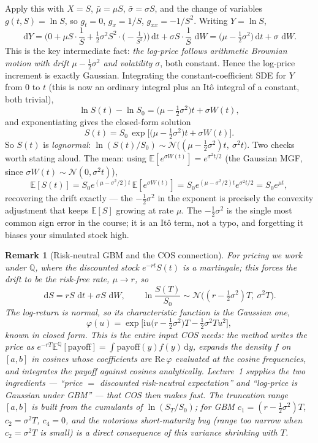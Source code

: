 \documentclass[11pt]{article}
\newcommand{\E}{\mathbb{E}}
\newcommand{\dd}{\,\mathrm{d}}
\newtheorem{remark}{Remark}
\begin{document}
Apply this with $X=S$, $\bar\mu=\mu S$, $\bar\sigma=\sigma S$, and the change of variables $g(t,S)=\ln S$, so $g_t=0$, $g_x=1/S$, $g_{xx}=-1/S^2$. Writing $Y=\ln S$,
\[
\dd Y=\Big(0+\mu S\cdot\frac1S+\tfrac12\sigma^2 S^2\cdot\big(-\tfrac1{S^2}\big)\Big)\dd t+\sigma S\cdot\frac1S\,\dd W
=\Big(\mu-\tfrac12\sigma^2\Big)\dd t+\sigma\,\dd W.
\]
This is the key intermediate fact: \emph{the log-price follows arithmetic Brownian motion with drift $\mu-\tfrac12\sigma^2$ and volatility $\sigma$}, both constant. Hence the log-price increment is exactly Gaussian. Integrating the constant-coefficient SDE for $Y$ from $0$ to $t$ (this is now an ordinary integral plus an It\^o integral of a constant, both trivial),
\[
\ln S(t)-\ln S_0=\Big(\mu-\tfrac12\sigma^2\Big)t+\sigma W(t),
\]
and exponentiating gives the closed-form solution
\[
\boxed{\,S(t)=S_0\,\exp\!\Big[\big(\mu-\tfrac12\sigma^2\big)t+\sigma W(t)\Big].\,}
\]
So $S(t)$ is \emph{lognormal}: $\ln(S(t)/S_0)\sim\mathcal{N}\big((\mu-\tfrac12\sigma^2)t,\ \sigma^2 t\big)$. Two checks worth stating aloud. The mean: using $\E[e^{\sigma W(t)}]=e^{\sigma^2 t/2}$ (the Gaussian MGF, since $\sigma W(t)\sim\mathcal{N}(0,\sigma^2 t)$),
\[
\E[S(t)]=S_0 e^{(\mu-\sigma^2/2)t}\,\E[e^{\sigma W(t)}]=S_0 e^{(\mu-\sigma^2/2)t}e^{\sigma^2 t/2}=S_0 e^{\mu t},
\]
recovering the drift exactly --- the $-\tfrac12\sigma^2$ in the exponent is precisely the convexity adjustment that keeps $\E[S]$ growing at rate $\mu$. The $-\tfrac12\sigma^2$ is the single most common sign error in the course; it is an It\^o term, not a typo, and forgetting it biases your simulated stock high.

\begin{remark}[Risk-neutral GBM and the COS connection]
For pricing we work under $\mathbb{Q}$, where the discounted stock $e^{-rt}S(t)$ is a martingale; this forces the drift to be the risk-free rate, $\mu\to r$, so
\[
\dd S=r S\,\dd t+\sigma S\,\dd W,\qquad
\ln\frac{S(T)}{S_0}\sim\mathcal{N}\big((r-\tfrac12\sigma^2)T,\ \sigma^2 T\big).
\]
The log-return is normal, so its \emph{characteristic function} is the Gaussian one,
\[
\varphi(u)=\exp\!\Big[\mathrm{i}u\big(r-\tfrac12\sigma^2\big)T-\tfrac12\sigma^2 T u^2\Big],
\]
known in closed form. This is the entire input COS needs: the method writes the price as $e^{-rT}\E^{\mathbb{Q}}[\text{payoff}]=\int \text{payoff}(y)f(y)\dd y$, expands the density $f$ on $[a,b]$ in cosines whose coefficients are $\mathrm{Re}\,\varphi$ evaluated at the cosine frequencies, and integrates the payoff against cosines analytically. Lecture~1 supplies the two ingredients --- ``price $=$ discounted risk-neutral expectation'' and ``log-price is Gaussian under GBM'' --- that COS then makes fast. The truncation range $[a,b]$ is built from the cumulants of $\ln(S_T/S_0)$; for GBM $c_1=(r-\tfrac12\sigma^2)T$, $c_2=\sigma^2 T$, $c_4=0$, and the notorious short-maturity bug (range too narrow when $c_2=\sigma^2T$ is small) is a direct consequence of this variance shrinking with $T$.
\end{remark}
\end{document}
